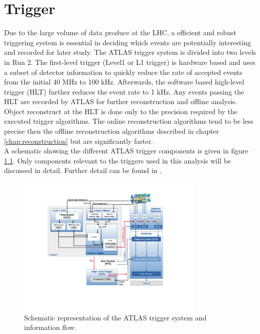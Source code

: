 \chapter{Trigger}
\label{chap:trigger}

\indent Due to the large volume of data produce at the LHC, a efficient and robust triggering system is essential in deciding which events are potentially interesting and recorded for later study.  The ATLAS trigger system is divided into two levels in Run 2.  The first-level trigger (Level1 or L1 trigger) is hardware based and uses a subset of detector information to quickly reduce the rate of accepted events from the initial 40 MHz to 100 kHz.  Afterwards, the software based high-level trigger (HLT) further reduces the event rate to 1 kHz.  Any events passing the HLT are recorded by ATLAS for further reconstruction and offline analysis. \\

\indent Object reconstruct at the HLT is done only to the precision required by the executed trigger algorithms.  The online reconstruction algorithms tend to be less precise then the offline reconstruction algorithms described in chapter \ref{chap:reconstruction} but are significantly faster. \\

\indent A schematic showing the different ATLAS trigger components is given in figure \ref{fig:trigScheme}.  Only components relevant to the triggers used in this analysis will be discussed in detail.  Further detail can be found in \cite{Trigger2015}.

\begin{figure}[htb]
  \begin{center}
    \includegraphics[width=0.80\textwidth]{figures/trigger/tdaq-schematic.png}\hspace{0.05\textwidth}
\end{center}
\caption{Schematic representation of the ATLAS trigger system and information flow.\cite{Trigger2015}}
\label{fig:trigScheme} 
\end{figure}

